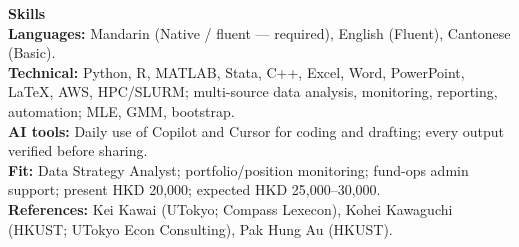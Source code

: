 \documentclass[11pt,letterpaper]{article}
\begin{document}
\vspace{0.15pt}

{\large \textbf{Skills}}\\[-0.5pt]
\textbf{Languages:} Mandarin (Native / fluent --- required), English (Fluent), Cantonese (Basic).\\
\textbf{Technical:} Python, R, MATLAB, Stata, C++, Excel, Word, PowerPoint, \LaTeX, AWS, HPC/SLURM; multi-source data analysis, monitoring, reporting, automation; MLE, GMM, bootstrap.\\
\textbf{AI tools:} Daily use of Copilot and Cursor for coding and drafting; every output verified before sharing.\\
\textbf{Fit:} Data Strategy Analyst; portfolio/position monitoring; fund-ops admin support; present HKD 20,000; expected HKD 25,000--30,000.\\
\textbf{References:} Kei Kawai (UTokyo; Compass Lexecon), Kohei Kawaguchi (HKUST; UTokyo Econ Consulting), Pak Hung Au (HKUST).
\end{document}
